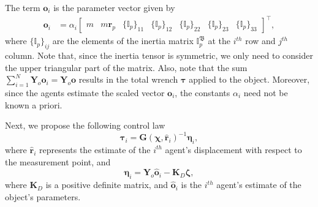 The term $\mathbf{o}_i$ is the parameter vector given by
\begin{align}   
    \mathbf{o}_i &= \alpha_i\begin{bmatrix}
        m & m\mathbf{r}_p & \{\mathbb{I}_p\}_{11} & \{\mathbb{I}_p\}_{12} & \{\mathbb{I}_p\}_{22} & \{\mathbb{I}_p\}_{23} & \{\mathbb{I}_p\}_{33}
    \end{bmatrix}^\top,
\end{align}
where $\{\mathbb{I}_p\}_{ij}$ are the elements of the inertia matrix $\mathbb{I}_p^\mathfrak{B}$ at the $i^{th}$ row and $j^{th}$ column. Note that, since the inertia tensor is symmetric, we only need to consider the upper triangular part of the matrix. Also, note that the sum $\sum_{i=1}^N\mathbf{Y}_o\mathbf{o}_i=\mathbf{Y}_o\mathbf{o}$ results in the total wrench $\boldsymbol{\tau}$ applied to the object. Moreover, since the agents estimate the scaled vector $\mathbf{o}_i$, the constants $\alpha_i$ need not be known a priori.

Next, we propose the following control law
\begin{equation}
    \boldsymbol{\tau}_i = \mathbf{G}(\boldsymbol{\chi}, \hat{\mathbf{r}}_i)^{-1}\boldsymbol{\eta}_i,\label{eq:controlLawTaui}
\end{equation}
where $\hat{\mathbf{r}}_i$ represents the estimate of the $i^{th}$ agent's displacement with respect to the measurement point, and
\begin{equation}
    \boldsymbol{\eta}_i = \mathbf{Y}_o\hat{\mathbf{o}}_i - \mathbf{K}_D\boldsymbol{\zeta}, \label{eq:controlLawEtai}
\end{equation}
where $\mathbf{K}_D$ is a positive definite matrix, and $\hat{\mathbf{o}}_i$ is the $i^{th}$ agent's estimate of the object's parameters. 


